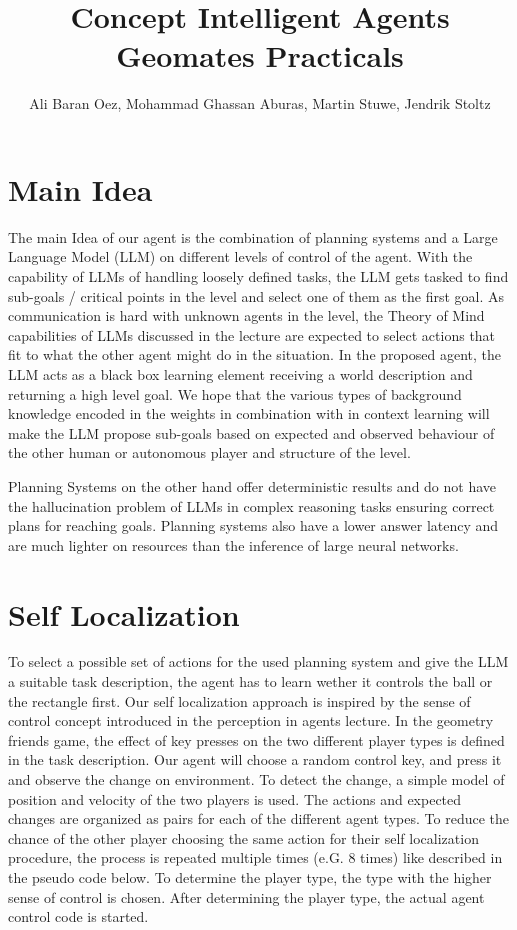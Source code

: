 \documentclass{article}
\title{Concept Intelligent Agents Geomates Practicals}
\author{Ali Baran Oez, Mohammad Ghassan Aburas, Martin Stuwe, Jendrik Stoltz}
\begin{document}
\maketitle

\section{Main Idea}

The main Idea of our agent is the combination of planning systems and a Large Language Model (LLM) on different levels of control of the agent. 
With the capability of LLMs of handling loosely defined tasks, the LLM gets tasked to find sub-goals / critical points in the level and select one of them as the first goal. As communication is hard with unknown agents in the level,  the Theory of Mind capabilities of LLMs discussed in the lecture are expected to select actions that fit to what the other agent might do in the situation. 
In the proposed agent, the LLM acts as a black box learning element receiving a world description and returning a high level goal. We hope that the various types of background knowledge encoded in the weights in combination with in context learning will make the LLM propose sub-goals based on expected and observed behaviour of the other human or autonomous player and structure of the level.

Planning Systems on the other hand offer deterministic results and do not have the hallucination problem of LLMs in complex reasoning tasks ensuring correct plans for reaching goals. Planning systems also have a lower answer latency and are much lighter on resources than the inference of large neural networks. 

\section{Self Localization}

To select a possible set of actions for the used planning system and give the LLM a suitable task description, the agent has to learn wether it controls the ball or the rectangle first. Our self localization approach is inspired by the sense of control concept introduced in the perception in agents lecture. 
In the geometry friends game, the effect of key presses on the two different player types is defined in the task description.
Our agent will choose a random control key, and press it and observe the change on environment. 
To detect the change, a simple model of position and velocity of the two players is used. 
The actions and expected changes are organized as pairs for each of the different agent types.
To reduce the chance of the other player choosing the same action for their self localization procedure, the process is repeated multiple times (e.G. 8 times) like described in the pseudo code below. To determine the player type, the type with the higher sense of control is chosen. After determining the player type, the actual agent control code is started.
\end{document}

